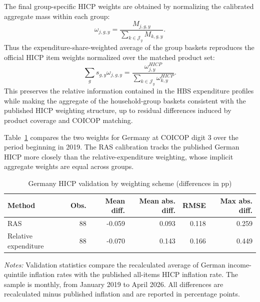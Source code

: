 \documentclass[11pt]{article}
\begin{document}
The final group-specific HICP weights are obtained by normalizing the calibrated aggregate mass
within each group:
\begin{equation}
\omega_{j,g,y}
=
\frac{M_{j,g,y}}{\sum_{k \in \mathcal{J}_y}M_{k,g,y}}.
\end{equation}
Thus the expenditure-share-weighted average of the group baskets reproduces the official HICP item
weights normalized over the matched product set:
\begin{equation}
\sum_g s_{g,y}\omega_{j,g,y}
=
\frac{\omega^{HICP}_{j,y}}
{\sum_{k \in \mathcal{J}_y}\omega^{HICP}_{k,y}}.
\end{equation}
This preserves the relative information contained in the HBS expenditure profiles while making the
aggregate of the household-group baskets consistent with the published HICP weighting structure, up
to residual differences induced by product coverage and COICOP matching.

Table~\ref{tab:de-normalization-validation} compares the two weights for Germany at COICOP digit 3
over the period beginning in 2019. The RAS
calibration tracks the published German HICP more closely than the relative-expenditure weighting, whose implicit aggregate weights are equal across groups.%

\begin{table}[H]
\centering
\caption{\label{tab:de-normalization-validation}Germany HICP validation by weighting scheme (differences in pp)}
\small
\begin{tabular}{lrrrrr}
\toprule
Method & Obs. & Mean diff. & Mean abs. diff. & RMSE & Max abs. diff. \\
\midrule
RAS & 88 & -0.059 & 0.093 & 0.118 & 0.259 \\
Relative expenditure & 88 & -0.070 & 0.143 & 0.166 & 0.449 \\
\bottomrule
\end{tabular}
\begin{minipage}{0.86\textwidth}
\footnotesize
\emph{Notes:} Validation statistics compare the recalculated average of German
income-quintile inflation rates with the published all-items HICP inflation
rate. The sample is monthly, from January 2019 to April 2026. All differences
are recalculated minus published inflation and are reported in percentage
points.
\end{minipage}
\end{table}




\clearpage
\begingroup
\setlength{\textfloatsep}{4pt plus 1pt minus 1pt}
\setlength{\floatsep}{4pt plus 1pt minus 1pt}
\setlength{\intextsep}{4pt plus 1pt minus 1pt}
\captionsetup{font=scriptsize,hypcap=false}
\end{document}
